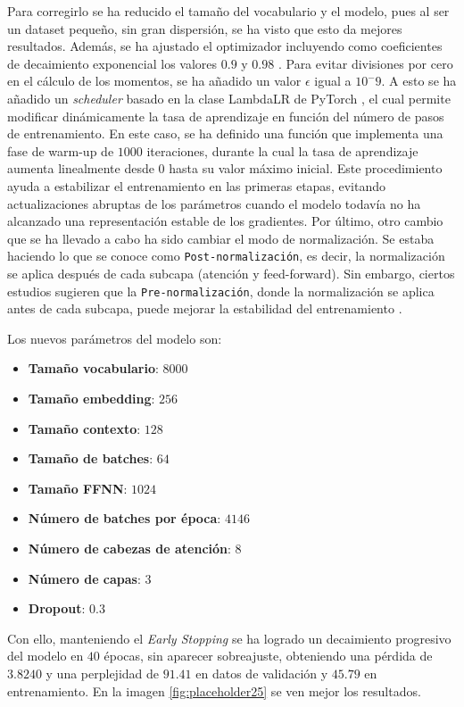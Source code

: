 \documentclass[11pt]{book}
\begin{document}
Para corregirlo se ha reducido el tamaño del vocabulario y el modelo, pues al ser un dataset pequeño, sin gran dispersión, se ha visto que esto da mejores resultados. Además, se ha ajustado el optimizador incluyendo como coeficientes de decaimiento exponencial los valores $0.9$ y $0.98$ \parencite{reddit_transformer_not_learning}. Para evitar divisiones por cero en el cálculo de los momentos, se ha añadido un valor $\epsilon$ igual a $10^-9$. A esto se ha añadido un \textit{scheduler} basado en la clase LambdaLR de PyTorch \parencite{pytorch_adjust_lr}, el cual permite modificar dinámicamente la tasa de aprendizaje en función del número de pasos de entrenamiento. En este caso, se ha definido una función que implementa una fase de warm-up de $1000$ iteraciones, durante la cual la tasa de aprendizaje aumenta linealmente desde 0 hasta su valor máximo inicial. Este procedimiento ayuda a estabilizar el entrenamiento en las primeras etapas, evitando actualizaciones abruptas de los parámetros cuando el modelo todavía no ha alcanzado una representación estable de los gradientes. Por último, otro cambio que se ha llevado a cabo ha sido cambiar el modo de normalización. Se estaba haciendo lo que se conoce como \texttt{Post-normalización}, es decir, la normalización se aplica después de cada subcapa (atención y feed-forward). Sin embargo, ciertos estudios sugieren que la \texttt{Pre-normalización}, donde la normalización se aplica antes de cada subcapa, puede mejorar la estabilidad del entrenamiento \parencite{doherty2024_hownot}.

Los nuevos parámetros del modelo son:
\begin{itemize}
    \item \textbf{Tamaño vocabulario}: $8000$
    \item \textbf{Tamaño embedding}: $256$
    \item \textbf{Tamaño contexto}: $128$
    \item \textbf{Tamaño de batches}: $64$
    \item \textbf{Tamaño FFNN}: $1024$
    \item \textbf{Número de batches por época}: $4146$
    \item \textbf{Número de cabezas de atención}: $8$
    \item \textbf{Número de capas}: $3$
    \item \textbf{Dropout}: $0.3$
\end{itemize}
Con ello, manteniendo el \textit{Early Stopping} se ha logrado un decaimiento progresivo del modelo en $40$ épocas, sin aparecer sobreajuste, obteniendo una pérdida de $3.8240$ y una perplejidad de $91.41$ en datos de validación y $45.79$ en entrenamiento. En la imagen \ref{fig:placeholder25} se ven mejor los resultados.
\end{document}
